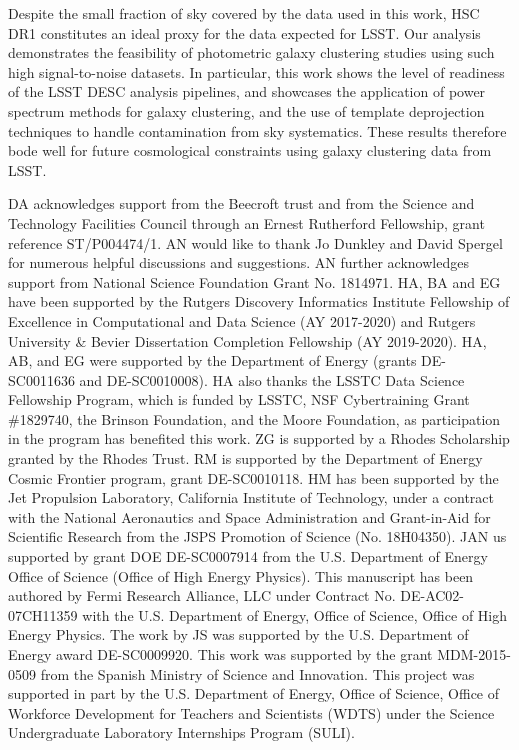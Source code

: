 \documentclass[a4paper,11pt]{article}
\begin{document}
  Despite the small fraction of sky covered by the data used in this work, HSC DR1 constitutes an ideal proxy for the data expected for LSST. Our analysis demonstrates the feasibility of photometric galaxy clustering studies using such high signal-to-noise datasets. In particular, this work shows the level of readiness of the LSST DESC analysis pipelines, and showcases the application of power spectrum methods for galaxy clustering, and the use of template deprojection techniques to handle contamination from sky systematics. These results therefore bode well for future cosmological constraints using galaxy clustering data from LSST.


\acknowledgments
  DA acknowledges support from the Beecroft trust and from the Science and Technology Facilities Council through an Ernest Rutherford Fellowship, grant reference ST/P004474/1.
  AN would like to thank Jo Dunkley and David Spergel for numerous helpful discussions and suggestions. AN further acknowledges support from National Science Foundation Grant No. 1814971.
  HA, BA and EG have been supported by the Rutgers Discovery Informatics Institute Fellowship of Excellence in Computational and Data Science (AY 2017-2020) and Rutgers University \& Bevier Dissertation Completion Fellowship (AY 2019-2020).
  HA, AB, and EG were supported by the Department of Energy (grants DE-SC0011636 and DE-SC0010008).
  HA also thanks the LSSTC Data Science Fellowship Program, which is funded by LSSTC, NSF Cybertraining Grant \#1829740, the Brinson Foundation, and the Moore Foundation, as participation in the program has benefited this work.
  ZG is supported by a Rhodes Scholarship granted by the Rhodes Trust.
  RM is supported by the Department of Energy Cosmic Frontier program, grant DE-SC0010118.
  HM has been supported by the Jet Propulsion Laboratory, California Institute of Technology, under a contract with the National Aeronautics and Space Administration and Grant-in-Aid for Scientific Research from the JSPS Promotion of Science (No. 18H04350). 
  JAN us supported by grant DOE DE-SC0007914 from the U.S. Department of Energy Office of Science (Office of High Energy Physics).
  This manuscript has been authored by Fermi Research Alliance, LLC under Contract No. DE-AC02-07CH11359 with the U.S. Department of Energy, Office of Science, Office of High Energy Physics.
  The work by JS was supported by the U.S. Department of Energy award DE-SC0009920.
  This work was supported by the grant MDM-2015-0509 from the Spanish Ministry of Science and Innovation.
  This project was supported in part by the U.S. Department of Energy, Office of Science, Office of Workforce Development for Teachers and Scientists (WDTS) under the Science Undergraduate Laboratory Internships Program (SULI).
\end{document}
